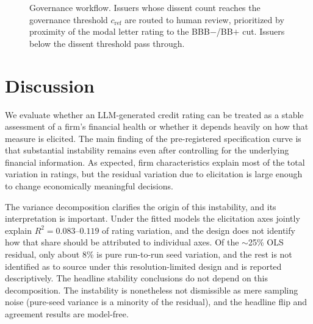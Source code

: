 \documentclass[a4paper,fleqn]{cas-sc}
\begin{document}
\begin{figure}[t]\centering
{}
\caption{Governance workflow. Issuers whose dissent count reaches the governance threshold
$c_{\mathrm{ref}}$ are routed to human review, prioritized by proximity of the modal letter rating
to the BBB$-$/BB$+$ cut. Issuers below the dissent threshold pass through.}
\label{fig:governance}
\end{figure}

\section{Discussion}
We evaluate whether an LLM-generated credit rating can be treated as a stable assessment of a firm's
financial health or whether it depends heavily on how that measure is elicited. The main finding of the
pre-registered specification curve is that substantial instability remains even after controlling for the
underlying financial information. As expected, firm characteristics explain most of the total variation
in ratings, but the residual variation due to elicitation is large enough to change economically
meaningful decisions.

The variance decomposition clarifies the origin of this instability, and its interpretation is important.
Under the fitted models the elicitation axes jointly explain $R^2=0.083$--$0.119$ of rating
variation, and the design does not identify how that share should be attributed to individual axes.
Of the $\sim$25\% OLS residual, only about 8\% is pure run-to-run seed variation, and the rest is
not identified as to source under this resolution-limited design and is reported descriptively. The headline stability conclusions do not depend on this decomposition.
The instability is nonetheless not dismissible as mere sampling noise (pure-seed variance is a minority of
the residual), and the headline flip and agreement results are model-free.
\end{document}
